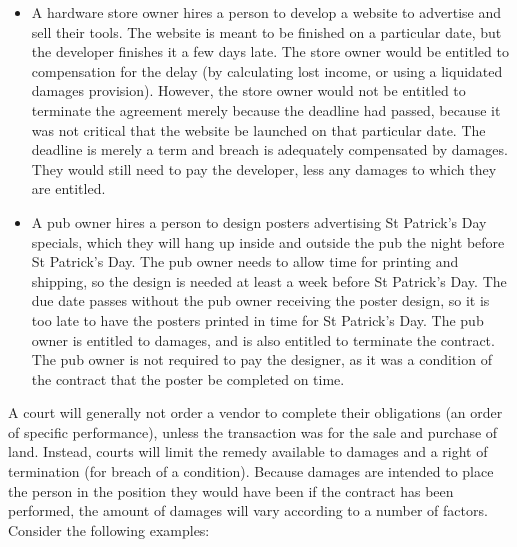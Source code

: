 \documentclass[a4paper,12pt]{article}
\begin{document}
\begin{itemize}
	\item A hardware store owner hires a person to develop a website to advertise and sell their tools. The website is meant to be finished on a particular date, but the developer finishes it a few days late. The store owner would be entitled to compensation for the delay (by calculating lost income, or using a liquidated damages provision). However, the store owner would not be entitled to terminate the agreement merely because the deadline had passed, because it was not critical that the website be launched on that particular date. The deadline is merely a term and breach is adequately compensated by damages. They would still need to pay the developer, less any damages to which they are entitled.
	\item A pub owner hires a person to design posters advertising St Patrick's Day specials, which they will hang up inside and outside the pub the night before St Patrick's Day. The pub owner needs to allow time for printing and shipping, so the design is needed at least a week before St Patrick's Day. The due date passes without the pub owner receiving the poster design, so it is too late to have the posters printed in time for St Patrick's Day. The pub owner is entitled to damages, and is also entitled to terminate the contract. The pub owner is not required to pay the designer, as it was a condition of the contract that the poster be completed on time.
\end{itemize}

A court will generally not order a vendor to complete their obligations (an order of specific performance), unless the transaction was for the sale and purchase of land. Instead, courts will limit the remedy available to damages and a right of termination (for breach of a condition). Because damages are intended to place the person in the position they would have been if the contract has been performed, the amount of damages will vary according to a number of factors. Consider the following examples:
\end{document}
